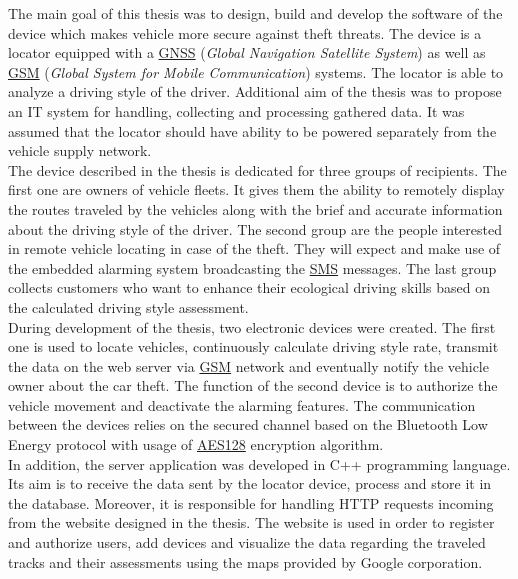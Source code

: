 \begin{singlespacing}


The main goal of this thesis was to design, build and develop the software of the device which makes vehicle more secure against theft threats. The device is a locator equipped with a \underline{GNSS} (\textit{Global Navigation Satellite System}) as well as \underline{GSM} (\textit{Global System for Mobile Communication}) systems. The locator is able to analyze a driving style of the driver. Additional  aim of the thesis was to propose an IT system for handling, collecting and processing gathered data. It was assumed that the locator should have ability to be powered separately from the vehicle supply network. \\

The device described in the thesis is dedicated for three groups of recipients. The first one are owners of vehicle fleets. It gives them the ability to remotely display the routes traveled by the vehicles along with the brief and accurate information about the driving style of the driver. The second group are the people interested in remote vehicle locating in case of the theft. They will expect and make use of the embedded alarming system broadcasting the \underline{SMS} messages. The last group collects customers who want to enhance their ecological driving skills based on the calculated driving style assessment. \\

During development of the thesis, two electronic devices were created. The first one is used to locate vehicles,  continuously calculate driving style rate, transmit the data on the web server via \underline{GSM} network and eventually notify the vehicle owner about the car theft. The function of the second device is to authorize the vehicle movement and deactivate the alarming features. The communication between the devices relies on the secured channel based on the Bluetooth Low Energy protocol with usage of \underline{AES128} encryption algorithm. \\

In addition, the server application was developed in C++ programming language. Its aim is to receive the data sent by the locator device, process and store it in the database. Moreover, it is responsible for handling HTTP requests incoming from the website designed in the thesis. The website is used in order to register and authorize users, add devices and visualize the data regarding the traveled tracks and their assessments using the maps provided by Google corporation. \\


\end{singlespacing}
